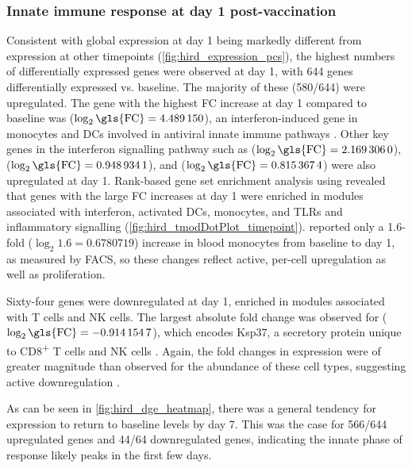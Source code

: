 \subsubsection{Innate immune response at day 1 post-vaccination}

Consistent with global expression at day 1 being markedly different from expression at other timepoints (\cref{fig:hird_expression_pcs}), the highest numbers of differentially expressed genes were observed at day 1, with 644 genes differentially expressed vs. baseline.
The majority of these (580/644) were upregulated.
The gene with the highest \gls{FC} increase at day 1 compared to baseline was  ($\log_2\text{\gls{FC}} = \num{4.489150}$), an interferon-induced gene in monocytes and \glspl{DC} involved in antiviral innate immune pathways \autocite{bin2016AnkyrinRepeatDomain}.
Other key genes in the interferon signalling pathway \autocite{schneider2014InterferonStimulatedGenesComplex} such as  ($\log_2\text{\gls{FC}} = \num{2.1693060}$),  ($\log_2\text{\gls{FC}} = \num{0.9489341}$), and  ($\log_2\text{\gls{FC}} = \num{0.8153674}$) were also upregulated at day 1.
Rank-based gene set enrichment analysis using  \autocite{weiner3rd2016TmodPackageGeneral} revealed that genes with the large \gls{FC} increases at day 1 were enriched in modules associated with interferon, activated \glspl{DC}, monocytes, and \glspl{TLR} and inflammatory signalling (\cref{fig:hird_tmodDotPlot_timepoint}).
\textcite{sobolev2016AdjuvantedInfluenzaH1N1Vaccination} reported only a 1.6-fold ($\log_2 1.6 = \num{0.6780719}$) increase in blood monocytes from baseline to day 1, as measured by \gls{FACS}, so these changes reflect active, per-cell upregulation as well as proliferation.

Sixty-four genes were downregulated at day 1, enriched in modules associated with T cells and \gls{NK} cells.
The largest absolute fold change was observed for  ($\log_2\text{\gls{FC}} = \num{-0.9141547}$), 
which encodes Ksp37, a secretory protein unique to CD8\textsuperscript{+} T cells and \gls{NK} cells \autocite{ogawa2001NovelSerumProtein}.
Again, the fold changes in expression were of greater magnitude than observed for the abundance of these cell types, suggesting active downregulation \textcite{sobolev2016AdjuvantedInfluenzaH1N1Vaccination}.

As can be seen in \cref{fig:hird_dge_heatmap}, there was a general tendency for expression to return to baseline levels by day 7.
This was the case for 566/644 upregulated genes and 44/64 downregulated genes,
indicating the innate phase of response likely peaks in the first few days.

